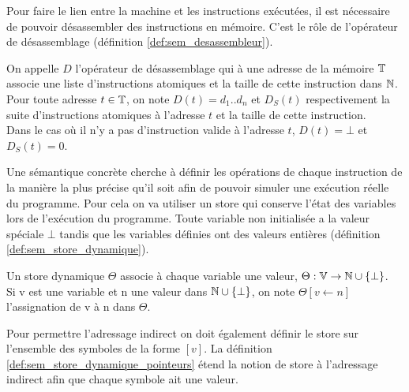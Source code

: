 
% 

Pour faire le lien entre la machine et les instructions exécutées, il est nécessaire de pouvoir désassembler des instructions en mémoire. C'est le rôle de l'opérateur de désassemblage (définition \ref{def:sem_desassembleur}).

\begin{defi}
On appelle $D$ l'opérateur de désassemblage qui à une adresse de la mémoire $\mathbb T$ associe une liste d'instructions atomiques et la taille de cette instruction dans $\mathbb N$. \\
Pour toute adresse $t\in\mathbb T$, on note $D(t)=d_1..d_n$ et $D_S(t)$ respectivement la suite d'instructions atomiques à l'adresse $t$ et la taille de cette instruction.\\
Dans le cas où il n'y a pas d'instruction valide à l'adresse $t$, $D(t)=\bot$ et $D_S(t)=0$.
\label{def:sem_desassembleur}
\end{defi}

Une sémantique concrète cherche à définir les opérations de chaque instruction de la manière la plus précise qu'il soit afin de pouvoir simuler une exécution réelle du programme.
Pour cela on va utiliser un store qui conserve l'état des variables lors de l'exécution du programme.
Toute variable non initialisée a la valeur spéciale $\bot$ tandis que les variables définies ont des valeurs entières (définition \ref{def:sem_store_dynamique}).

\begin{defi}
 Un store dynamique $\Theta$ associe à chaque variable une valeur, $\Theta:\mathbb V\rightarrow\mathbb N\cup\{\bot\}$.\\
 Si v est une variable et n une valeur dans $\mathbb N\cup\{\bot\}$, on note $\Theta[v\leftarrow n]$ l'assignation de v à n dans $\Theta$.
\label{def:sem_store_dynamique}
\end{defi}

Pour permettre l'adressage indirect on doit également définir le store sur l'ensemble des symboles de la forme $[v]$.
La définition \ref{def:sem_store_dynamique_pointeurs} étend la notion de store à l'adressage indirect afin que chaque symbole ait une valeur.


